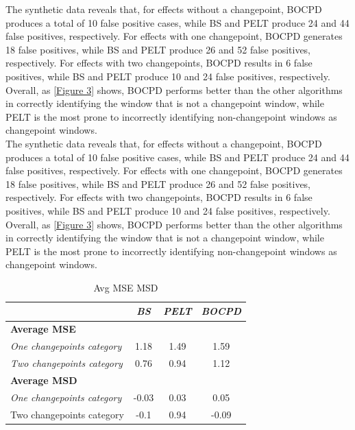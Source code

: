 \documentclass[]{interact}
\theoremstyle{plain}%
\theoremstyle{definition}
\theoremstyle{remark}
\begin{document}
{    The synthetic data reveals that, for effects without a changepoint, BOCPD produces a total of 10 false positive cases, while BS and PELT produce 24 and 44 false positives, respectively. For effects with one changepoint, BOCPD generates 18 false positives, while BS and PELT produce 26 and 52 false positives, respectively. For effects with two changepoints, BOCPD results in 6 false positives, while BS and PELT produce 10 and 24 false positives, respectively. Overall, as \autoref{Figure 3} shows, BOCPD performs better than the other algorithms in correctly identifying the window that is not a changepoint window, while PELT is the most prone to incorrectly identifying non-changepoint windows as changepoint windows. \\
    
    The synthetic data reveals that, for effects without a changepoint, BOCPD produces a total of 10 false positive cases, while BS and PELT produce 24 and 44 false positives, respectively. For effects with one changepoint, BOCPD generates 18 false positives, while BS and PELT produce 26 and 52 false positives, respectively. For effects with two changepoints, BOCPD results in 6 false positives, while BS and PELT produce 10 and 24 false positives, respectively. Overall, as \autoref{Figure 3} shows, BOCPD performs better than the other algorithms in correctly identifying the window that is not a changepoint window, while PELT is the most prone to incorrectly identifying non-changepoint windows as changepoint windows.

    \begin{table}[H]
    	\centering
    	\renewcommand{\arraystretch}{1.2} %
    	\small
    	\begin{tabular}{lccc}
    		\hline
    		& \textit{BS} & \textit{PELT} & \textit{BOCPD} \\ \hline
    		\textbf{Average MSE}               &             &               &                \\
    		\textit{One changepoints category} & 1.18        & 1.49          & 1.59           \\
    		\textit{Two changepoints category} & 0.76        & 0.94          & 1.12           \\
    		\textbf{Average MSD}               &             &               &                \\
    		\textit{One changepoints category} & -0.03       & 0.03          & 0.05           \\
    		Two changepoints category          & -0.1        & 0.94          & -0.09          \\ \hline
    	\end{tabular}
    \caption{Avg MSE MSD}
    \label{b}
    \end{table}
	
}
\end{document}
